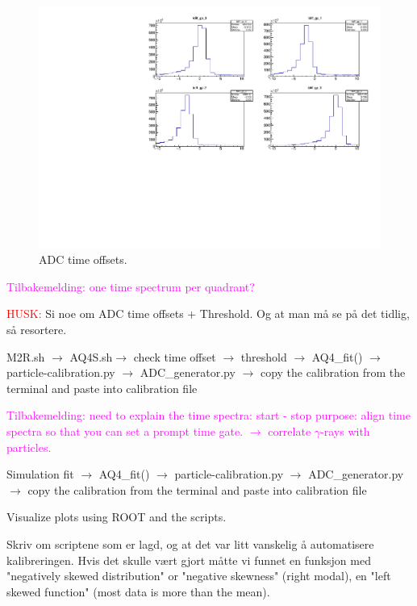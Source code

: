 \documentclass[twoside,english]{uiofysmaster/uiofysmaster}
\begin{document}
\begin{figure}[ht]
	\centering
	\includegraphics[width=\textwidth]{../Plots/plotting/tdiff_gp_0-3-user.pdf}
	\caption{ADC time offsets.}
	\label{fig:ADC_dt}
\end{figure}

\textcolor{Magenta}{Tilbakemelding: \newline 
one time spectrum per quadrant?
}


\textcolor{red}{HUSK:} Si noe om ADC time offsets + Threshold. Og at man må se på det tidlig, så resortere.


M2R.sh $\rightarrow$ AQ4S.sh$\rightarrow$ check time offset $\rightarrow$ threshold $\rightarrow$ AQ4\_fit() $\rightarrow$ particle-calibration.py $\rightarrow$  ADC\_generator.py $\rightarrow$ copy the calibration from the terminal and paste into calibration file 

\textcolor{Magenta}{Tilbakemelding: \newline 
need to explain the time spectra: start - stop \newline
purpose: align time spectra so that you can set a prompt time gate. \newline
$\rightarrow$ correlate $\gamma$-rays with particles.
}


Simulation fit $\rightarrow$ AQ4\_fit() $\rightarrow$ particle-calibration.py $\rightarrow$  ADC\_generator.py $\rightarrow$ copy the calibration from the terminal and paste into calibration file 

Visualize plots using ROOT and the scripts. 



Skriv om scriptene som er lagd, og at det var litt vanskelig å automatisere kalibreringen. Hvis det skulle vært gjort måtte vi funnet en funksjon med "negatively skewed distribution" or "negative skewness" (right modal), en "left skewed function" (most data is more than the mean). 
\end{document}
